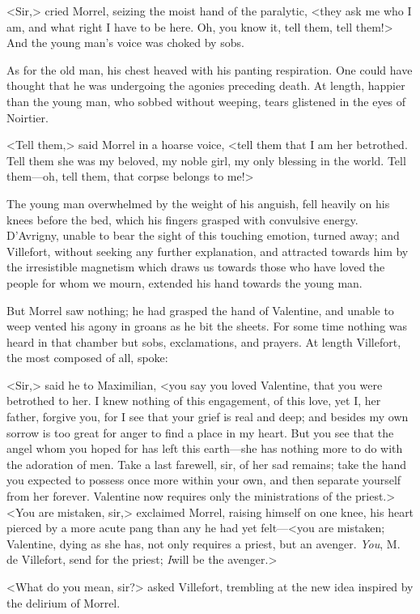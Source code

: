  <Sir,> cried Morrel, seizing the moist hand of the paralytic, <they ask me who I am, and what right I have to be here. Oh, you know it, tell them, tell them!> And the young man's voice was choked by sobs. 

 As for the old man, his chest heaved with his panting respiration. One could have thought that he was undergoing the agonies preceding death. At length, happier than the young man, who sobbed without weeping, tears glistened in the eyes of Noirtier. 

 <Tell them,> said Morrel in a hoarse voice, <tell them that I am her betrothed. Tell them she was my beloved, my noble girl, my only blessing in the world. Tell them—oh, tell them, that corpse belongs to me!> 

 The young man overwhelmed by the weight of his anguish, fell heavily on his knees before the bed, which his fingers grasped with convulsive energy. D'Avrigny, unable to bear the sight of this touching emotion, turned away; and Villefort, without seeking any further explanation, and attracted towards him by the irresistible magnetism which draws us towards those who have loved the people for whom we mourn, extended his hand towards the young man. 

 But Morrel saw nothing; he had grasped the hand of Valentine, and unable to weep vented his agony in groans as he bit the sheets. For some time nothing was heard in that chamber but sobs, exclamations, and prayers. At length Villefort, the most composed of all, spoke: 

 <Sir,> said he to Maximilian, <you say you loved Valentine, that you were betrothed to her. I knew nothing of this engagement, of this love, yet I, her father, forgive you, for I see that your grief is real and deep; and besides my own sorrow is too great for anger to find a place in my heart. But you see that the angel whom you hoped for has left this earth—she has nothing more to do with the adoration of men. Take a last farewell, sir, of her sad remains; take the hand you expected to possess once more within your own, and then separate yourself from her forever. Valentine now requires only the ministrations of the priest.>  <You are mistaken, sir,> exclaimed Morrel, raising himself on one knee, his heart pierced by a more acute pang than any he had yet felt—<you are mistaken; Valentine, dying as she has, not only requires a priest, but an avenger. \textit{You}, M. de Villefort, send for the priest; \textit{I}will be the avenger.>

 <What do you mean, sir?> asked Villefort, trembling at the new idea inspired by the delirium of Morrel. 

